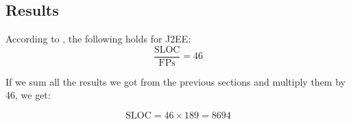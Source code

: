 \subsection{Results} %
\label{sub:results}
According to \cite{bib:fp}, the following holds for J2EE:
\begin{equation*}
    \frac{\mbox{SLOC}}{\mbox{FPs}} = 46
\end{equation*}

If we sum all the results we got from the previous sections and multiply them by 46, we get:

\begin{equation*}
     \mbox{SLOC} = 46 \times 189 = 8694
 \end{equation*} 

